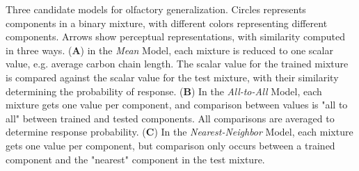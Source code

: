 \label{fig:cartoon}
Three candidate models for olfactory generalization.  Circles represents components in a binary mixture, with different colors representing different components.  Arrows show perceptual representations, with similarity computed in three ways. (\textbf{A}) in the \textit{Mean} Model, each mixture is reduced to one scalar value, e.g. average carbon chain length.  The scalar value for the trained mixture is compared against the scalar value for the test mixture, with their similarity determining the probability of response. (\textbf{B}) In the \textit{All-to-All} Model, each mixture gets one value per component, and comparison between values is "all to all" between trained and tested components.  All comparisons are averaged to determine response probability. (\textbf{C}) In the \textit{Nearest-Neighbor} Model, each mixture gets one value per component, but comparison only occurs between a trained component and the "nearest" component in the test mixture.  